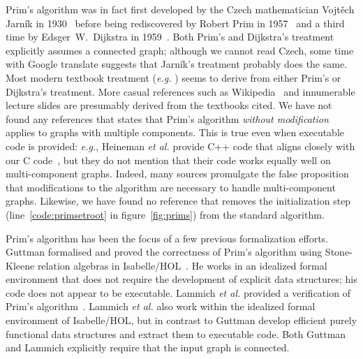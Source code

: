 Prim's algorithm was in fact first developed by the Czech mathematician Vojt\v{e}ch Jarn\'{i}k in 1930~\cite{prim1:jarnik} before being rediscovered by Robert Prim in 1957~\cite{prim2:prim} and a third time by Edsger~W.~Dijkstra in 1959~\cite{prim3:dijkstra}.  Both Prim's and Dijkstra's treatment explicitly assumes a connected graph; although we cannot read Czech, some time with Google translate suggests that Jarn\'{i}k's treatment probably does the same.  Most modern textbook treatment (\emph{e.g.} \cite{kepnergilbert,sedgewick,rozen,DBLP:books/daglib/0022194,clrs}) seems to derive from either Prim's or Dijkstra's treatment.
More casual references such as Wikipedia~\cite{prim:wiki} and innumerable lecture slides are presumably derived from the textbooks cited.  We have not found any references that states that Prim's algorithm \emph{without modification} applies to graphs with multiple components.  This is true even when executable code is provided: \emph{e.g.}, Heineman \emph{et al.} provide C++ code that aligns closely with our C code~\cite{heineman2008algorithms}, but they do not mention that their code works equally well on multi-component graphs.  Indeed, many sources promulgate the false proposition that modifications to the algorithm are necessary to handle multi-component graphs.  Likewise, we have found no reference that removes the initialization step (line~\ref{code:primsetroot} in figure~\ref{fig:prims}) from the standard algorithm.

Prim's algorithm has been the focus of a few previous formalization efforts.  Guttman formalised and proved the correctness of Prim's algorithm using Stone-Kleene relation algebras in Isabelle/HOL~\cite{DBLP:conf/ictac/Guttmann16}.  He works in an idealized formal environment that does not require the development of explicit data structures; his code does not appear to be executable.  Lammich \emph{et al.} provided a verification of Prim's algorithm~\cite{DBLP:journals/afp/LammichN19}.  Lammich \emph{et al.} also work within the idealized formal environment of Isabelle/HOL, but in contrast to Guttman develop efficient purely functional data structures and extract them to executable code.  Both Guttman and Lammich explicitly require that the input graph is connected. %





